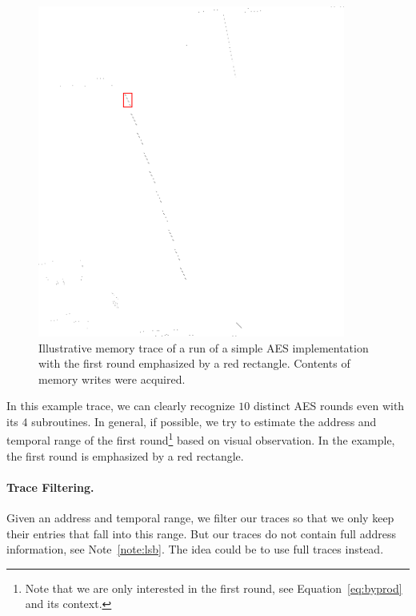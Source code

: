 		\begin{figure}[h!]
		\begin{center}
			\includegraphics[width=0.9\textwidth]{./figures/memtrace/memtrace_emph.png}
			\caption{Illustrative memory trace of a run of a simple AES implementation with the first round emphasized by a red rectangle. Contents of memory writes were acquired.}
			\label{fig:memtrace}
		\end{center}
		\end{figure}
		
		In this example trace, we can clearly recognize $10$ distinct AES rounds even with its $4$ subroutines. In general, if possible, we try to estimate the address and temporal range of the first round\footnote{Note that we are only interested in the first round, see Equation~\ref{eq:byprod} and its context.} based on visual observation. In the example, the first round is emphasized by a red rectangle.
	
	\newpage   %
	
	\paragraph{Trace Filtering.}
		
		Given an address and temporal range, we filter our traces so that we only keep their entries that fall into this range. But our traces do not contain full address information, see Note~\ref{note:lsb}. The idea could be to use full traces instead.
		
